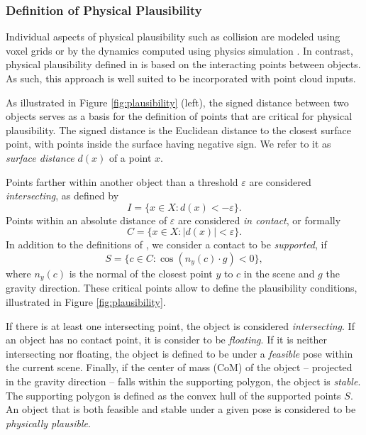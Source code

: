 \documentclass[10pt,twocolumn,letterpaper]{article}
\begin{document}
%
\subsubsection{Definition of Physical Plausibility}
Individual aspects of physical plausibility such as collision are modeled using voxel grids \cite{wada2020morefusion} or by the dynamics computed using physics simulation \cite{mitash2018mcts,bauer2020verefine}. In contrast, physical plausibility defined in \cite{bauer2020eccvw} is based on the interacting points between objects. As such, this approach is well suited to be incorporated with point cloud inputs.

As illustrated in Figure \ref{fig:plausibility} (left), the signed distance between two objects serves as a basis for the definition of points that are critical for physical plausibility. The signed distance is the Euclidean distance to the closest surface point, with points inside the surface having negative sign. We refer to it as \textit{surface distance} $d(x)$ of a point $x$. 

Points farther within another object than a threshold $\varepsilon$ are considered \textit{intersecting}, as defined by
\begin{equation}\label{eq:intersecting}
    I = \{x \in X: d(x) < -\varepsilon\}.
\end{equation}
Points within an absolute distance of $\varepsilon$ are considered \textit{in contact}, or formally
\begin{equation}\label{eq:contact}
    C = \{x \in X: | d(x)| < \varepsilon\}.
\end{equation}
In addition to the definitions of \cite{bauer2020eccvw}, we consider a contact to be \textit{supported}, if
\begin{equation}\label{eq:supported}
    S = \{c \in C: \cos(n_y(c) \cdot g) < 0\},
\end{equation}
where $n_y(c)$ is the normal of the closest point $y$ to $c$ in the scene and $g$ the gravity direction. These critical points allow to define the plausibility conditions, illustrated in Figure \ref{fig:plausibility}. 

If there is at least one intersecting point, the object is considered \textit{intersecting}. If an object has no contact point, it is consider to be \textit{floating}. If it is neither intersecting nor floating, the object is defined to be under a \textit{feasible} pose within the current scene. Finally, if the center of mass (CoM) of the object -- projected in the gravity direction -- falls within the supporting polygon, the object is \textit{stable}. The supporting polygon is defined as the convex hull of the supported points $S$. An object that is both feasible and stable under a given pose is considered to be \textit{physically plausible}.
%
\end{document}
